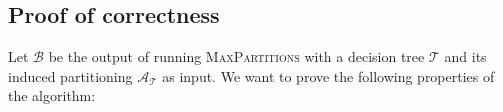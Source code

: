 \begin{algorithm}[!ht]
\begin{algorithmic}[1]

                        
                \Else
                \EndIf%

            \EndWhile%

            \item[]

        \EndWhile%


    \end{algorithmic}

\end{algorithm}



\subsection{Proof of correctness}%
\label{sec:proofCorrectness}

\noindent
Let $\mathcal{B}$ be the output of running \textsc{MaxPartitions} with a
decision tree $\mathcal{T}$ and its induced partitioning
$\mathcal{A}_{\mathcal{T}}$ as input. We want to prove the following properties
of the algorithm:

